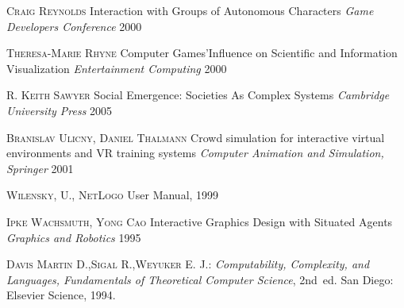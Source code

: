 \documentclass[runningheads]{llncs}
\begin{document}
\begin{thebibliography}{0}
\textsc{Craig Reynolds}
\newblock Interaction with Groups of Autonomous Characters 
\newblock \emph{Game Developers Conference} 2000

\textsc{Theresa-Marie Rhyne}
\newblock Computer Games’Influence on Scientific and Information Visualization
\newblock \emph{Entertainment Computing} 2000

\textsc{R. Keith Sawyer}
\newblock Social Emergence: Societies As Complex Systems 
\newblock \emph{Cambridge University Press} 2005

\textsc{Branislav Ulicny, Daniel Thalmann}
\newblock Crowd simulation for interactive virtual environments and VR training systems 
\newblock \emph{Computer Animation and Simulation, Springer} 2001

\textsc{Wilensky, U., NetLogo}
\newblock User Manual, 1999

\textsc{Ipke Wachsmuth, Yong Cao}
\newblock Interactive Graphics Design with Situated Agents 
\newblock \emph{Graphics and Robotics} 1995

\textsc{Davis Martin D.,Sigal R.,Weyuker E. J.}:
\newblock \emph{Computability, Complexity, and Languages, Fundamentals of Theoretical Computer Science}, 2nd~ed.
\newblock San Diego: Elsevier Science, 1994.

\end{thebibliography}
\end{document}
